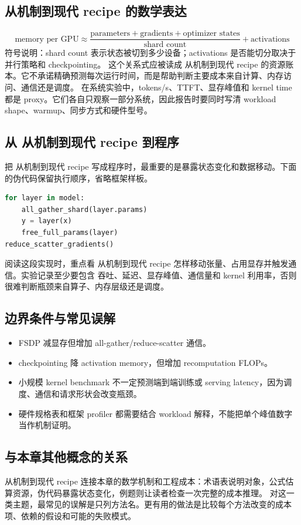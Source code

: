 \documentclass[a4paper]{article}
\begin{document}
\subsection{从机制到现代 recipe 的数学表达}
\[\text{memory per GPU}\approx \frac{\text{parameters}+\text{gradients}+\text{optimizer states}}{\text{shard count}}+\text{activations}\]
符号说明：shard count 表示状态被切到多少设备；activations 是否能切分取决于并行策略和 checkpointing。
这个关系式应被读成 从机制到现代 recipe 的资源账本。它不承诺精确预测每次运行时间，而是帮助判断主要成本来自计算、内存访问、通信还是调度。
在系统实验中，tokens/s、TTFT、显存峰值和 kernel time 都是 proxy。它们各自只观察一部分系统，因此报告时要同时写清 workload shape、warmup、同步方式和硬件型号。
\subsection{从 从机制到现代 recipe 到程序}
把 从机制到现代 recipe 写成程序时，最重要的是暴露状态变化和数据移动。下面的伪代码保留执行顺序，省略框架样板。
\begin{lstlisting}[language=Python]
for layer in model:
    all_gather_shard(layer.params)
    y = layer(x)
    free_full_params(layer)
reduce_scatter_gradients()
\end{lstlisting}
阅读这段实现时，重点看 从机制到现代 recipe 怎样移动张量、占用显存并触发通信。实验记录至少要包含 吞吐、延迟、显存峰值、通信量和 kernel 利用率，否则很难判断瓶颈来自算子、内存层级还是调度。
\subsection{边界条件与常见误解}
\begin{itemize}
\item FSDP 减显存但增加 all-gather/reduce-scatter 通信。
\item checkpointing 降 activation memory，但增加 recomputation FLOPs。
\item 小规模 kernel benchmark 不一定预测端到端训练或 serving latency，因为调度、通信和请求形状会改变瓶颈。
\item 硬件规格表和框架 profiler 都需要结合 workload 解释，不能把单个峰值数字当作机制证明。
\end{itemize}
\subsection{与本章其他概念的关系}
从机制到现代 recipe 连接本章的数学机制和工程成本：术语表说明对象，公式估算资源，伪代码暴露状态变化，例题则让读者检查一次完整的成本推理。
对这一类主题，最常见的误解是只列方法名。更有用的做法是比较每个方法改变的成本项、依赖的假设和可能的失败模式。
\end{document}
